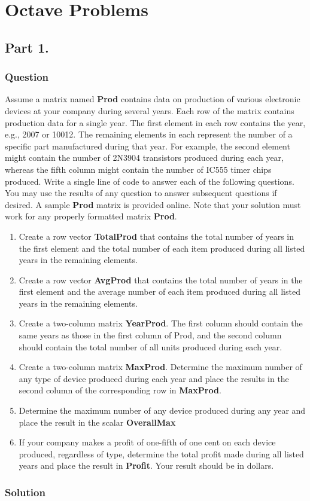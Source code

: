 \documentclass[a4paper, 10pt]{article}
\begin{document}
	\section{Octave Problems}
		\subsection{Part 1.}
			\subsubsection{Question}
				\noindent Assume a matrix named \textbf{Prod} contains data on production of various electronic devices at your company during several years. Each row of the
				matrix contains production data for a single year. The first element in each row contains the year, e.g., 2007 or 10012. The remaining elements 
				in each represent the number of a specific part manufactured during that year.
				For example, the second element might contain the number of 2N3904 transistors produced during each year, whereas the fifth column might 
				contain the number of IC555 timer chips produced.
				Write a single line of code to answer each of the following questions. You may use the results of any question to answer subsequent questions if 
				desired. A sample \textbf{Prod} matrix is provided online. Note that your solution must work for any properly formatted matrix \textbf{Prod}.
				
				\begin{enumerate}[label=\alph*.]
					\item Create a row vector \textbf{TotalProd} that contains the total number of years in the first element and the total number of each item produced during all listed years in the remaining elements. 
					\item Create a row vector \textbf{AvgProd} that contains the total number of years in the first element and the average number of each item produced during all listed years in the remaining elements.
					\item Create a two-column matrix \textbf{YearProd}. The first column should contain the same years as those in the first column of Prod, and the second column should contain the total number of all units produced during each year.
					\item Create a two-column matrix \textbf{MaxProd}. Determine the maximum number of any type of device produced during each year and place the results in the second column of the corresponding row in \textbf{MaxProd}.
					\item Determine the maximum number of any device produced during any year and place the result in the scalar \textbf{OverallMax}
					\item If your company makes a profit of one-fifth of one cent on each device produced, regardless of type, determine the total profit made during all listed years and place the result in \textbf{Profit}. Your result should be in dollars.
				\end{enumerate}
			\subsubsection{Solution}	
				
\end{document}
